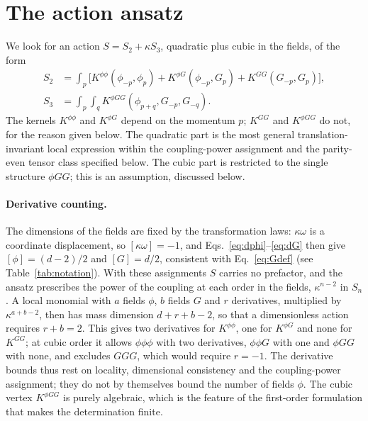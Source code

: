 \documentclass[prd,aps,preprint,superscriptaddress,nofootinbib,amsmath,amssymb,eqsecnum]{revtex4-2}
\newcommand{\ip}[1]{\int_{#1}}
\begin{document}
\section{The action ansatz}
\label{sec:ansatz}

We look for an action $S=S_2+\kappa S_3$, quadratic plus cubic in the fields, of the form
\begin{equation}
\begin{aligned}
S_2&=\ip{p}\Big[K^{\phi\phi}(\phi_{-p},\phi_p)+K^{\phi G}(\phi_{-p},G_p)+K^{GG}(G_{-p},G_p)\Big],\\
S_3&=\ip{p}\ip{q}K^{\phi GG}(\phi_{p+q},G_{-p},G_{-q}).
\end{aligned}
\label{eq:ansatz}
\end{equation}
The kernels $K^{\phi\phi}$ and $K^{\phi G}$ depend on the momentum $p$; $K^{GG}$ and
$K^{\phi GG}$ do not, for the reason given below.
The quadratic part is the most general translation-invariant local expression within the
coupling-power assignment and the parity-even tensor class specified below. The cubic part
is restricted to the single structure $\phi GG$; this is an assumption, discussed below.

\paragraph{Derivative counting.} The dimensions of the fields are fixed by the
transformation laws: $\kappa\omega$ is a coordinate displacement, so $[\kappa\omega]=-1$,
and Eqs.~\eqref{eq:dphi}--\eqref{eq:dG} then give $[\phi]=(d-2)/2$ and $[G]=d/2$, consistent
with Eq.~\eqref{eq:Gdef} (see Table~\ref{tab:notation}). With these assignments $S$ carries no
prefactor, and the ansatz prescribes the power of the coupling at each order in the fields,
$\kappa^{n-2}$ in $S_n$. A local monomial with $a$ fields $\phi$, $b$ fields $G$ and $r$
derivatives, multiplied by $\kappa^{a+b-2}$, then has mass dimension $d+r+b-2$, so that a
dimensionless action requires $r+b=2$. This gives two derivatives for $K^{\phi\phi}$, one for $K^{\phi G}$ and none for $K^{GG}$;
at cubic order it allows $\phi\phi\phi$ with two derivatives, $\phi\phi G$ with one and
$\phi GG$ with none, and excludes $GGG$, which would require $r=-1$. The derivative bounds
thus rest on locality, dimensional consistency and the coupling-power assignment; they do
not by themselves bound the number of fields $\phi$. The cubic vertex $K^{\phi GG}$ is purely
algebraic, which is the feature of the first-order formulation that makes the determination
finite.
\end{document}
